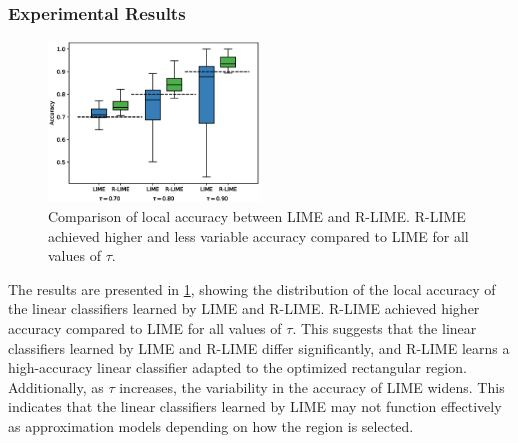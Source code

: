 \documentclass[runningheads]{llncs}
\begin{document}
\subsubsection{Experimental Results}
\begin{figure}[tbp]
  \centering
  \includegraphics[width=0.5\textwidth]{box_plot}
  \caption[Comparison of Local Accuracy between R-LIME and LIME]{%
    Comparison of local accuracy between LIME and R-LIME\@.
    R-LIME achieved higher and less variable accuracy compared to LIME
    for all values of $\tau$.
  }\label{fig:box-plot}
\end{figure}
The results are presented in \cref{fig:box-plot},
showing the distribution of the local accuracy of the linear classifiers
learned by LIME and R-LIME\@.
R-LIME achieved higher accuracy compared to LIME for all values of $\tau$.
This suggests that the linear classifiers learned by LIME and R-LIME
differ significantly,
and R-LIME learns a high-accuracy linear classifier
adapted to the optimized rectangular region.
Additionally, as $\tau$ increases,
the variability in the accuracy of LIME widens.
This indicates that the linear classifiers learned by LIME may not function
effectively as approximation models depending on how the region is selected.
\end{document}
